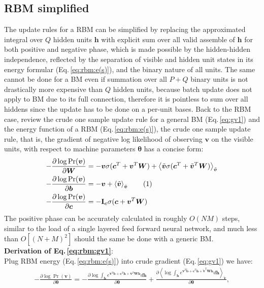 \documentclass[11pt]{article}
\newcommand{\mean}[2]{\left\langle{#1}\right\rangle_{#2}}
\newcommand\numberthis{\addtocounter{equation}{1}\tag{\theequation}}
\newcommand{\vb}{\boldsymbol{b}}
\newcommand{\vc}{\boldsymbol{c}}
\newcommand{\vh}{\boldsymbol{h}}
\newcommand{\vv}{\boldsymbol{v}}
\newcommand{\vw}{\boldsymbol{w}}
\newcommand{\mw}{\boldsymbol{W}}
\newcommand{\vbt}{\tilde{\vb}}
\newcommand{\vvt}{\tilde{\vv}}
\newcommand{\pEC}{\boldsymbol{\theta}}
\newcommand{\PDV}[2]{\frac{\partial #1}{\partial #2}}
\newcommand{\im}{\textrm{\textbf{I}}}
\begin{document}
{%
\subsection{RBM simplified}
The update rules for a RBM can be simplified by replacing the approximated integral over $Q$ hidden units $\vh$ with explicit sum over all valid assemble of $\vh$ for both positive and negative phase, which is made possible by the hidden-hidden independence, reflected by the separation of visible and hidden unit states in its energy formular (Eq.\,\ref{eq:rbm:e(s)}), and the binary nature of all units. The same cannot be done for a BM even if summation over all $P+Q$ binary units is not drastically more expensive than $Q$ hidden units, because batch update does not apply to BM due to its full connection, therefore it is pointless to sum over all hiddens since the update has to be done on a per-unit bases.
Back to the RBM case, review the crude one sample update rule for a general BM (Eq.\,\ref{eq:gv1}) and the energy function of a RBM (Eq.\,\ref{eq:rbm:e(s)}), the crude one sample update rule, that is, the gradient of negative log likelihood of observing $\vv$ on the visible units, with respect to machine parameters $\pEC$ has a concise form:
\begin{align*}\label{eq:rbm:gv1}
  -\PDV{\log{\Pr(\vv)}}{\mw} & = -\vv\sigma(\vc^T + \vv^T\mw)  + \mean{\vvt\sigma(\vc^T + \vvt^T\mw)}{\vvt} \\
  -\PDV{\log{\Pr(\vv)}}{\vb} & = -\vv + \mean{\vvt}{\vvt}  \numberthis \\
  -\PDV{\log{\Pr(\vv)}}{\vc} & = -\im_{\vc} \sigma(\vc + \vv^T\mw)
\end{align*}
The positive phase can be accurately calculated in roughly $O(NM)$ steps, similar to the load of a single layered feed forward neural network, and much less than $O[(N+M)^2]$ should the same be done with a generic BM.\\
\textbf{Derivation of Eq.\,{\eqref{eq:rbm:gv1}}}: \\
Plug RBM energy (Eq.\,\ref{eq:rbm:e(s)}) into crude gradient (Eq.\,\ref{eq:gv1}) we have:
\begin{align*}
  -\PDV{\log{\Pr(\vv)}}{\pEC} = -\PDV{\log{\int_{\vh}{e^{\vv^T\vb + \vc^T\vh + \vv^T\mw\vh}d\vh}}}{\pEC} + \PDV{\mean{\log{\int_{\vh}{e^{\vv^T\vbt + \vc^T\vh + \vvt^T\mw\vh}d\vh}}}{\vvt}}{\pEC},

\end{align*}}
\end{document}
